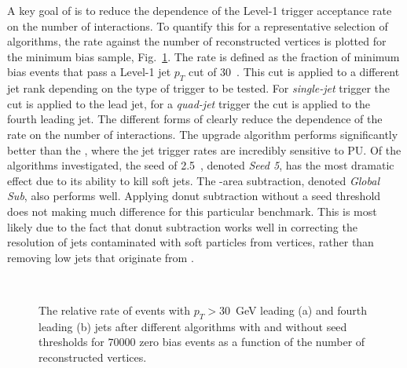 A key goal of \PUS is to reduce the dependence of the Level-1 trigger
acceptance rate on the number of \PU interactions. To quantify this
for a representative selection of algorithms, the rate against the
number of reconstructed vertices is plotted for the minimum bias sample,
Fig.~\ref{fig:ratenvtx}. The rate is defined as the fraction of
minimum bias events that pass a Level-1 jet $p_T$ cut of $30$~\gev.
This cut is applied to a different jet rank depending on the type of
trigger to be tested. For \emph{single-jet} trigger the cut is applied to
the lead jet, for a \emph{quad-jet} trigger the cut is applied to the
fourth leading jet. The different forms of \PUS clearly reduce the
dependence of the rate on the number of interactions. The upgrade algorithm
performs significantly better than the \GCT, where the jet trigger
rates are incredibly sensitive to PU. Of the algorithms investigated,
the seed of 2.5~\gev, denoted \emph{Seed 5}, has the most dramatic
effect due to its ability to kill soft \PU jets. The \rho-area
subtraction, denoted \emph{Global Sub}, also performs well. Applying
donut subtraction without a seed threshold does not making much difference for this
particular \PUS benchmark. This is most likely due to the fact that
donut subtraction works well in correcting the resolution of jets
contaminated with soft particles from \PU vertices, rather than
removing low \pT jets that originate from \PU.

\begin{figure}
  \centering
  ~ 
  \caption{The relative rate of events with $p_T>30$~GeV leading (a)
  and fourth leading (b) jets after different \PUS algorithms with and
  without seed thresholds for $70 000$ zero bias events as a function
  of the number of reconstructed vertices.}
  \label{fig:ratenvtx}
\end{figure}

